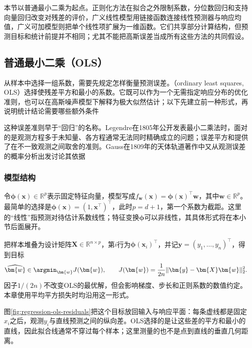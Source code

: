 本节以普通最小二乘为起点。正则化方法在拟合之外限制系数，分位数回归和支持向量回归改变对残差的评价，广义线性模型用链接函数连接线性预测器与响应均值，广义可加模型则把单个线性项扩展为一维函数。它们共享部分计算结构，但预测目标和统计前提并不相同；尤其不能把高斯误差当成所有这些方法的共同假设。

\subsection{普通最小二乘（OLS）}
\label{sec:regression-ols}

从样本中选择一组系数，需要先规定怎样衡量预测误差。（ordinary least squares, OLS）选择使残差平方和最小的系数。它既可以作为一个无需指定响应分布的优化准则，也可以在高斯噪声模型下解释为极大似然估计；以下先建立前一种形式，再说明统计结论需要哪些额外条件

这种误差准则早于“回归”的名称。Legendre在1805年公开发表最小二乘法时，面对的是观测方程多于未知量、各方程通常无法同时精确成立的问题；误差平方和提供了在不一致观测之间取舍的准则。Gauss在1809年的天体轨道著作中又从观测误差的概率分析出发讨论其依据

\subsubsection{模型结构}
\label{sec:regression-ols-structure}

令$\bm{\phi}(\bm{x})\in\mathbb{R}^{p}$表示固定特征向量，模型写成$f_{\bm{w}}(\bm{x})=\bm{\phi}(\bm{x})^{\top}\bm{w}$，其中$\bm{w}\in\mathbb{R}^{p}$。最简单的选择是$\bm{\phi}(\bm{x})=(1,\bm{x}^{\top})^{\top}$，此时$p=d+1$，第一个系数为截距。这里的“线性”指预测对待估计系数线性；特征变换$\bm{\phi}$可以非线性，其具体形式将在本小节后面展开。

把样本堆叠为设计矩阵$\bm{X}\in\mathbb{R}^{n\times p}$，第$i$行为$\bm{\phi}(\bm{x}_i)^{\top}$，并记$\bm{y}=(y_1,\ldots,y_n)^{\top}$，得到目标
\begin{equation}
  \widehat{\bm{w}}\in\argmin_{\bm{w}}J(\bm{w}),
  \qquad
  J(\bm{w})=\frac{1}{2n}\lVert\bm{y}-\bm{X}\bm{w}\rVert_2^2.
  \label{eq:regression-ols-objective}
\end{equation}
因子$1/(2n)$不改变OLS的最优解，但会影响梯度、步长和正则系数的数值约定。本章使用平均平方损失时均沿用这一形式。

图\ref{fig:regression-ols-residuals}把这个目标放回输入与响应平面：每条虚线都是固定$x_i$之后，观测$y_i$与直线预测之间的纵向差。OLS选择的是让这些差的平方和最小的直线，因此拟合线通常不穿过每个样本；这里测量的也不是点到直线的垂直几何距离。

